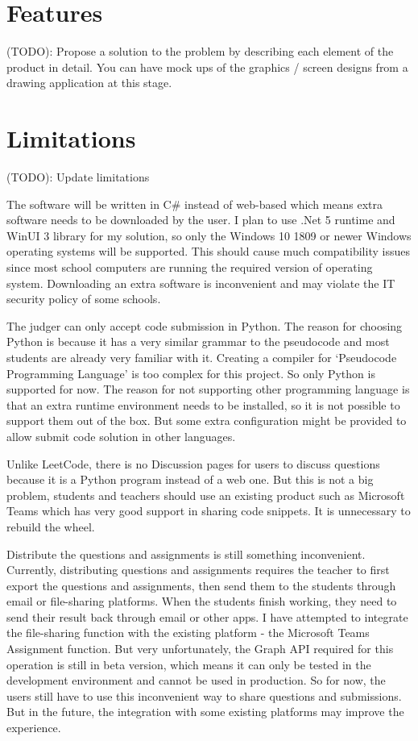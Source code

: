 \documentclass[a4paper]{report}
\begin{document}
\section{Features}

 (TODO): Propose a solution to the problem by describing each element of the product in detail.  You can have mock ups of the graphics / screen designs from a drawing application at this stage.

\section{Limitations}

(TODO): Update limitations

The software will be written in C# instead of web-based which means extra software needs to be downloaded by the user. I plan to use .Net 5 runtime and WinUI 3 library for my solution, so only the Windows 10 1809 or newer Windows operating systems will be supported. This should cause much compatibility issues since most school computers are running the required version of operating system. Downloading an extra software is inconvenient and may violate the IT security policy of some schools.

The judger can only accept code submission in Python. The reason for choosing Python is because it has a very similar grammar to the pseudocode and most students are already very familiar with it. Creating a compiler for `Pseudocode Programming Language' is too complex for this project. So only Python is supported for now. The reason for not supporting other programming language is that an extra runtime environment needs to be installed, so it is not possible to support them out of the box. But some extra configuration might be provided to allow submit code solution in other languages.

Unlike LeetCode, there is no Discussion pages for users to discuss questions because it is a Python program instead of a web one. But this is not a big problem, students and teachers should use an existing product such as Microsoft Teams which has very good support in sharing code snippets. It is unnecessary to rebuild the wheel.

Distribute the questions and assignments is still something inconvenient. Currently, distributing questions and assignments requires the teacher to first export the questions and assignments, then send them to the students through email or file-sharing platforms. When the students finish working, they need to send their result back through email or other apps. I have attempted to integrate the file-sharing function with the existing platform - the Microsoft Teams Assignment function. But very unfortunately, the Graph API required for this operation is still in beta version, which means it can only be tested in the development environment and cannot be used in production. So for now, the users still have to use this inconvenient way to share questions and submissions. But in the future, the integration with some existing platforms may improve the experience.
\end{document}

